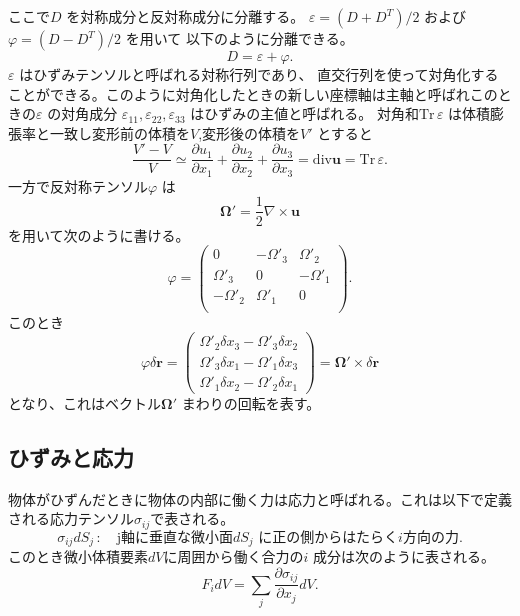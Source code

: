 \documentclass[dvipdfmx,11pt]{jsreport}
\numberwithin{equation}{chapter}
\numberwithin{table}{chapter}
\begin{document}
ここで$D$ を対称成分と反対称成分に分離する。
$\varepsilon=(D+D^{T}) /2$ および$\varphi= (D-D^{T}) /2$ を用いて
以下のように分離できる。
\begin{equation}
\label{eq:4}
	D=\varepsilon+\varphi
.\end{equation}
$\varepsilon$ はひずみテンソルと呼ばれる対称行列であり、
直交行列を使って対角化することができる。このように対角化したときの新しい座標軸は主軸と呼ばれこのときの$\varepsilon$ の対角成分
$\varepsilon_{11},\varepsilon_{22},\varepsilon_{33}$ はひずみの主値と呼ばれる。
対角和$\mathrm{Tr}\,\varepsilon$ は体積膨張率と一致し変形前の体積を$V$,変形後の体積を$V'$ とすると
\begin{equation}
\label{eq:5}
	\frac{V'-V}{V}\simeq \frac{\partial u_1}{\partial x_1} +\frac{\partial u_2}{\partial x_2} +\frac{\partial u_3}{\partial x_3} =\mathrm{div} \bm{u}=\mathrm{Tr}\,\varepsilon
.\end{equation}
一方で反対称テンソル$\varphi$ は
\begin{equation}
\label{eq:6}
\bm{\Omega'}=\frac{1}{2}\nabla \times \bm{u}
\end{equation}
を用いて次のように書ける。
\begin{equation}
\label{eq:7}
\varphi=\begin{pmatrix} 0&-\Omega'_3&\Omega'_2\\\Omega'_3&0&-\Omega'_1\\-\Omega'_2&\Omega'_1&0\\ \end{pmatrix} 
.\end{equation}
このとき
\begin{equation}
\label{eq:8}
	\varphi \delta \bm{r}=\begin{pmatrix} \Omega'_2 \delta x_3-\Omega'_3 \delta x_2\\ \Omega'_3 \delta x_1-\Omega'_1 \delta x_3\\\Omega'_1 \delta x_2- \Omega'_2 \delta x_1 \end{pmatrix} =  \bm{\Omega'}\times  \delta \bm{r}
\end{equation}
となり、これはベクトル$\bm{\Omega'}$ まわりの回転を表す。
\subsection{ひずみと応力}
物体がひずんだときに物体の内部に働く力は応力と呼ばれる。これは以下で定義される応力テンソル$\sigma_{ij}$で表される。
\begin{equation}
\label{eq:9}
	\sigma_{ij}dS_j \,:\quad \text{j軸に垂直な微小面$dS_j$ に正の側からはたらく$i$方向の力}
.\end{equation}
このとき微小体積要素$dV$に周囲から働く合力の$i$ 成分は次のように表される。
\begin{equation}
\label{eq:10}
	F_i dV = \sum_{j}^{} \frac{\partial \sigma_{ij}}{\partial x_j} dV
.\end{equation}
\end{document}
